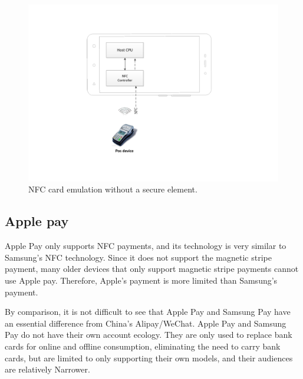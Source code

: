 \documentclass[journal]{IEEEtran}
\begin{document}
\begin{figure}[htbp]
\centerline{\includegraphics[scale=0.58]{NFC_cpu.pdf}}
\caption{NFC card emulation without a secure element.}
\label{fig}
\end{figure}

\subsection{Apple pay}
Apple Pay only supports NFC payments, and its technology is very similar to Samsung's NFC technology. Since it does not support the magnetic stripe payment, many older devices that only support magnetic stripe payments cannot use Apple pay. Therefore, Apple's payment is more limited than Samsung's payment.

By comparison, it is not difficult to see that Apple Pay and Samsung Pay have an essential difference from China’s Alipay/WeChat. Apple Pay and Samsung Pay do not have their own account ecology. They are only used to replace bank cards for online and offline consumption, eliminating the need to carry bank cards, but are limited to only supporting their own models, and their audiences are relatively Narrower.
\end{document}
